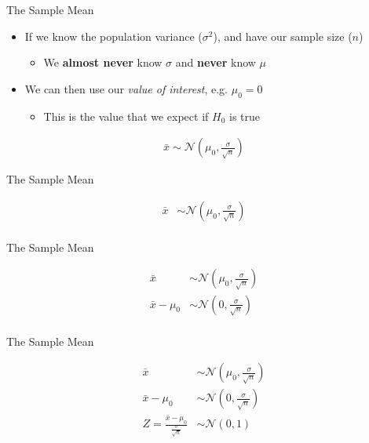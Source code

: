 \documentclass[aspectratio=169,11pt]{beamer}
\begin{document}
\begin{frame}{The Sample Mean}

	\begin{itemize}
		\item If we know the population variance ($\sigma^2$), and have our sample size ($n$)
		\begin{itemize}
			\item We \textbf{almost never} know $\sigma$ and \textbf{never} know $\mu$
		\end{itemize}
		\item We can then use our \textit{value of interest}, e.g. $\mu_0 = 0$
		\begin{itemize}
			\item This is the value that we expect if $H_0$ is true
		\end{itemize}
	\end{itemize}

	\begin{align*}
	\bar{x} \sim \mathcal{N}(\mu_0, \frac{\sigma}{\sqrt{n}})
	\end{align*}


\end{frame}

\begin{frame}{The Sample Mean}

	\begin{align*}
		\bar{x} &\sim \mathcal{N}(\mu_0, \frac{\sigma}{\sqrt{n}})\\[3mm]
	\end{align*}

\end{frame}

\begin{frame}{The Sample Mean}

	\begin{align*}
		\bar{x} &\sim \mathcal{N}(\mu_0, \frac{\sigma}{\sqrt{n}})\\[3mm]
		\bar{x} - \mu_0 &\sim \mathcal{N}(0, \frac{\sigma}{\sqrt{n}}) \\[3mm]
	\end{align*}

\end{frame}

\begin{frame}{The Sample Mean}

	\begin{align*}
		\bar{x} &\sim \mathcal{N}(\mu_0, \frac{\sigma}{\sqrt{n}})\\[3mm]
		\bar{x} - \mu_0 &\sim \mathcal{N}(0, \frac{\sigma}{\sqrt{n}}) \\[3mm]
		Z = \frac{\bar{x} - \mu_0}{\frac{\sigma}{\sqrt{n}}} &\sim \mathcal{N}(0, 1)
	\end{align*}

\end{frame}
\end{document}
